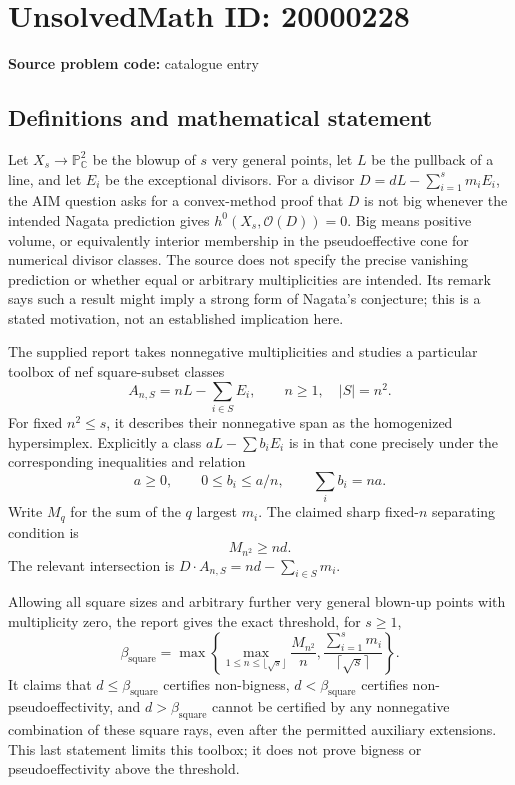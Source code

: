 \documentclass[11pt]{article}
\newcommand{\C}{\mathbb{C}}
\newcommand{\PP}{\mathbb{P}}
\begin{document}
\section*{UnsolvedMath ID: 20000228}
\textbf{Source problem code:} catalogue entry
\subsection{Definitions and mathematical statement}
Let $X_s\to\PP^2_{\C}$ be the blowup of $s$ very general points, let $L$ be the pullback of a line, and let $E_i$ be the exceptional divisors. For a divisor $D=dL-\sum_{i=1}^s m_iE_i$, the AIM question asks for a convex-method proof that $D$ is not big whenever the intended Nagata prediction gives $h^0(X_s,\mathcal O(D))=0$. Big means positive volume, or equivalently interior membership in the pseudoeffective cone for numerical divisor classes. The source does not specify the precise vanishing prediction or whether equal or arbitrary multiplicities are intended. Its remark says such a result might imply a strong form of Nagata's conjecture; this is a stated motivation, not an established implication here.

The supplied report takes nonnegative multiplicities and studies a particular toolbox of nef square-subset classes
\[
 A_{n,S}=nL-\sum_{i\in S}E_i,\qquad n\geq1,\quad |S|=n^2.
\]
For fixed $n^2\leq s$, it describes their nonnegative span as the homogenized hypersimplex. Explicitly a class $aL-\sum b_iE_i$ is in that cone precisely under the corresponding inequalities and relation
\[
 a\geq0,\qquad 0\leq b_i\leq a/n,\qquad\sum_i b_i=na.
\]
Write $M_q$ for the sum of the $q$ largest $m_i$. The claimed sharp fixed-$n$ separating condition is
\[
 M_{n^2}\geq nd.
\]
The relevant intersection is $D\cdot A_{n,S}=nd-\sum_{i\in S}m_i$.

Allowing all square sizes and arbitrary further very general blown-up points with multiplicity zero, the report gives the exact threshold, for $s\geq1$,
\[
 \beta_{\mathrm{square}}=
 \max\left\{\max_{1\leq n\leq\lfloor\sqrt s\rfloor}\frac{M_{n^2}}n,
 \frac{\sum_{i=1}^s m_i}{\lceil\sqrt s\rceil}\right\}.
\]
It claims that $d\leq\beta_{\mathrm{square}}$ certifies non-bigness, $d<\beta_{\mathrm{square}}$ certifies non-pseudoeffectivity, and $d>\beta_{\mathrm{square}}$ cannot be certified by any nonnegative combination of these square rays, even after the permitted auxiliary extensions. This last statement limits this toolbox; it does not prove bigness or pseudoeffectivity above the threshold.
\end{document}
